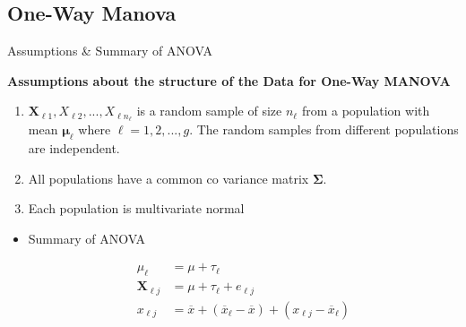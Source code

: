 \documentclass[8pt]{beamer}
\begin{document}
\subsection{One-Way Manova}
    \begin{frame}{Assumptions \& Summary of ANOVA}
    
    \textbf{Assumptions about the structure of the Data for One-Way MANOVA}
        \begin{enumerate}
            \item $\mathbf{X}_{\ell 1}, X_{\ell 2}, ..., X_{\ell n_{\ell}}$ is a random sample of size $n_{\ell}$ from a population with mean $\mathbf{\mu_{\ell}}$ where $\ell = 1,2,...,g$. The random samples from different populations are independent. 
            \item All populations have a common co variance matrix $\mathbf{\Sigma}$.
            \item Each population is multivariate normal
        \end{enumerate}
    
        \begin{itemize}
            \item Summary of ANOVA 
            
            \begin{align}
                \mu_{\ell} &= \mu + \tau_{\ell}\\
                \mathbf{X}_{\ell j} &= \mu + \tau_{\ell} + e_{\ell j}\\
                x_{\ell j} &= \overline{x} + (\overline{x}_{\ell} - \overline{x}) + (x_{\ell j} - \overline{x}_{\ell})
            \end{align}
        \end{itemize}
    
    
    \end{frame}
    
\end{document}
